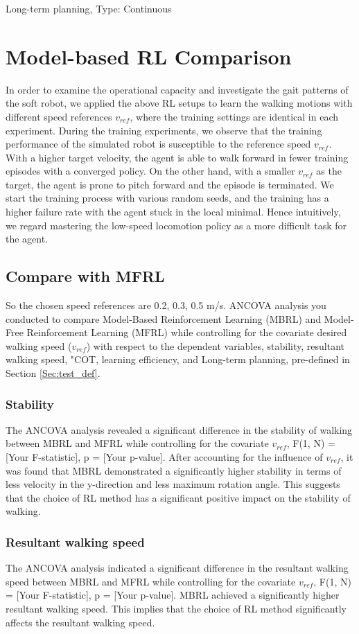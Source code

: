 Long-term planning, Type: Continuous

\section{Model-based RL Comparison}
\label{Sec:MBRL}

In order to examine the operational capacity and investigate the gait patterns of the soft robot, we applied the above RL setups to learn the walking motions with different speed references $v_{ref}$, where the training settings are identical in each experiment. During the training experiments, we observe that the training performance of the simulated robot is susceptible to the reference speed $v_{ref}$. With a higher target velocity, the agent is able to walk forward in fewer training episodes with a converged policy. On the other hand, with a smaller $v_{ref}$ as the target, the agent is prone to pitch forward and the episode is terminated. We start the training process with various random seeds, and the training has a higher failure rate with the agent stuck in the local minimal. Hence intuitively, we regard mastering the low-speed locomotion policy as a more difficult task for the agent.
\subsection{Compare with MFRL}
So the chosen speed references are 0.2, 0.3, 0.5 m/s. ANCOVA analysis you conducted to compare Model-Based Reinforcement Learning (MBRL) and Model-Free Reinforcement Learning (MFRL) while controlling for the covariate desired walking speed ($v_{ref}$) with respect to the dependent variables, stability, resultant walking speed, "\ac{COT}, learning efficiency, and Long-term planning, pre-defined in Section \ref{Sec:test_def}. 
\subsubsection*{Stability}
The ANCOVA analysis revealed a significant difference in the stability of walking between MBRL and MFRL while controlling for the covariate $v_{ref}$, F(1, N) = [Your F-statistic], p = [Your p-value]. After accounting for the influence of $v_{ref}$, it was found that MBRL demonstrated a significantly higher stability in terms of less velocity in the y-direction and less maximum rotation angle. This suggests that the choice of RL method has a significant positive impact on the stability of walking.
\subsubsection*{Resultant walking speed}
The ANCOVA analysis indicated a significant difference in the resultant walking speed between MBRL and MFRL while controlling for the covariate $v_{ref}$, F(1, N) = [Your F-statistic], p = [Your p-value]. MBRL achieved a significantly higher resultant walking speed. This implies that the choice of RL method significantly affects the resultant walking speed.
